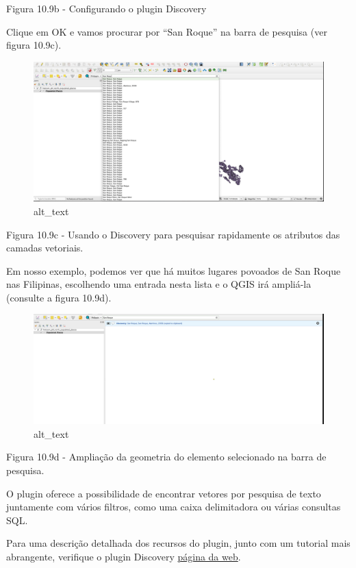 \documentclass[
]{book}
\begin{document}
Figura 10.9b - Configurando o plugin Discovery

Clique em OK e vamos procurar por ``San Roque'' na barra de pesquisa (ver figura 10.9c).

\begin{figure}
\centering
\includegraphics{media/modulo10/fig109_c.png}
\caption{alt\_text}
\end{figure}

Figura 10.9c - Usando o Discovery para pesquisar rapidamente os atributos das camadas vetoriais.

Em nosso exemplo, podemos ver que há muitos lugares povoados de San Roque nas Filipinas, escolhendo uma entrada nesta lista e o QGIS irá ampliá-la (consulte a figura 10.9d).

\begin{figure}
\centering
\includegraphics{media/modulo10/fig109_d.png}
\caption{alt\_text}
\end{figure}

Figura 10.9d - Ampliação da geometria do elemento selecionado na barra de pesquisa.

O plugin oferece a possibilidade de encontrar vetores por pesquisa de texto juntamente com vários filtros, como uma caixa delimitadora ou várias consultas SQL.

Para uma descrição detalhada dos recursos do plugin, junto com um tutorial mais abrangente, verifique o plugin Discovery \href{https://www.lutraconsulting.co.uk/projects/discovery/}{página da web}.
\end{document}
